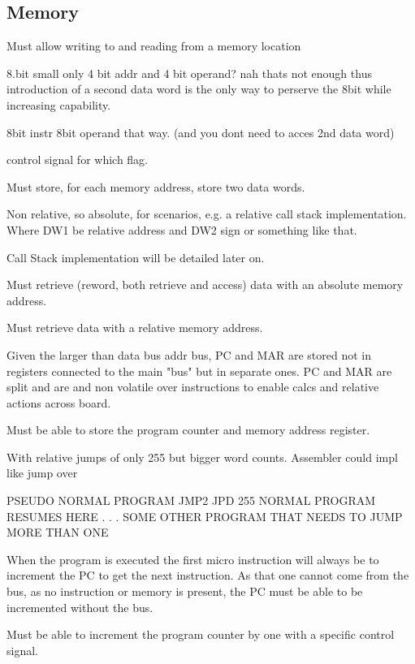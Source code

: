 \subsection{Memory}

\begin{turing-requirement}
Must allow writing to and reading from a memory location
\end{turing-requirement}


8.bit small
only 4 bit addr and 4 bit operand? nah thats not enough
thus introduction of a second data word is the only way to perserve the 8bit while increasing capability. 

8bit instr 8bit operand that way. (and you dont need to acces 2nd data word)

control signal for which flag. 

\begin{feat-requirement}
Must store, for each memory address, store two data words. 
\end{feat-requirement}


Non relative, so absolute, for scenarios, e.g. a relative call stack implementation.
Where DW1 be relative address 
and DW2 sign or something like that. 

Call Stack implementation will be detailed later on. 
\begin{feat-requirement}
Must retrieve (reword, both retrieve and access) data with an absolute memory address. 
\end{feat-requirement}

\begin{feat-requirement}
Must retrieve data with a relative memory address. 
\end{feat-requirement}


Given the larger than data bus addr bus, PC and MAR are stored not in registers connected to the main "bus" but in separate ones. 
PC and MAR are split and are and non volatile over instructions to enable calcs and relative actions across board.

\begin{feat-requirement}
Must be able to store the program counter and memory address register.
\end{feat-requirement}

With relative jumps of only 255 but bigger word counts. 
Assembler could impl like jump over 

PSEUDO
NORMAL PROGRAM
JMP2
JPD 255 
NORMAL PROGRAM RESUMES HERE
.
.
.
SOME OTHER PROGRAM THAT NEEDS TO JUMP MORE THAN ONE

When the program is executed the first micro instruction will always be to increment the PC to get the next instruction. As that one cannot come from the bus, as no instruction or memory is present, the PC must be able to be incremented without the bus.
\begin{feat-requirement}
    Must be able to increment the program counter by one with a specific control signal.
\end{feat-requirement}

% 
